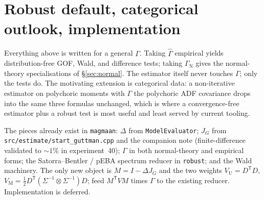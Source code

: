 \documentclass[11pt]{article}
\newcommand{\T}{^{\mathsf T}}
\newcommand{\Ninv}{^{-1}}
\theoremstyle{plain}
\theoremstyle{definition}
\theoremstyle{remark}
\begin{document}
\section{Robust default, categorical outlook, implementation}\label{sec:impl}

Everything above is written for a general $\Gamma$. Taking $\widehat\Gamma$
empirical yields distribution-free GOF, Wald, and difference tests; taking
$\Gamma_{\mathrm N}$ gives the normal-theory specialisations of
\S\ref{sec:normal}. The estimator itself never touches $\Gamma$; only the tests
do. The motivating extension is categorical data: a non-iterative estimator on
polychoric moments with $\Gamma$ the polychoric ADF covariance drops into the
same three formulas unchanged, which is where a convergence-free estimator plus
a robust test is most useful and least served by current tooling.

The pieces already exist in \texttt{magmaan}: $\Delta$ from
\texttt{ModelEvaluator}; $J_G$ from \texttt{src/estimate/start\_guttman.cpp}
and the companion note (finite-difference validated to $\sim1\%$ in
experiment~40); $\Gamma$ in both normal-theory and empirical forms; the
Satorra--Bentler / pEBA spectrum reducer in \texttt{robust}; and the Wald
machinery. The only new object is $M=I-\Delta J_G$ and the two weights
$V_{\mathrm U}=D\T D$, $V_{\mathrm M}=\tfrac12 D\T(\Sigma\Ninv\otimes
\Sigma\Ninv)D$; feed $M\T V M$ times $\Gamma$ to the existing reducer.
Implementation is deferred.
\end{document}
